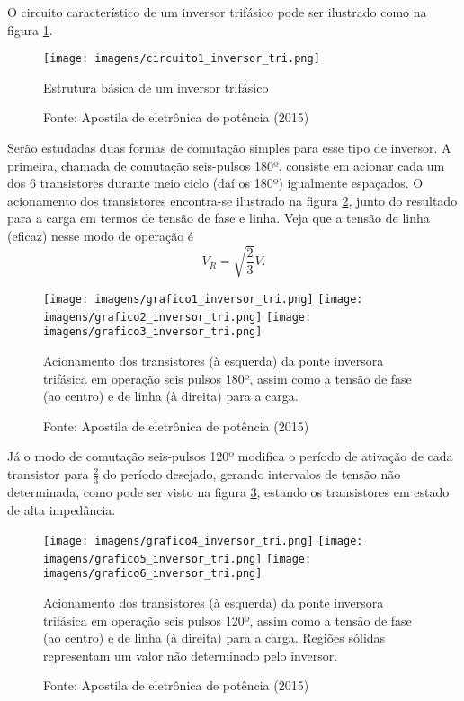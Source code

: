 
O circuito característico de um inversor trifásico pode ser ilustrado como na figura \ref{c1it}.

\begin{figure}[h]
\center
\texttt{[image: imagens/circuito1\_inversor\_tri.png]}
\caption{Estrutura básica de um inversor trifásico}\label{c1it} 
\caption*{Fonte: Apostila de eletrônica de potência (2015)}
\end{figure}

Serão estudadas duas formas de comutação simples para esse tipo de inversor. A primeira, chamada de comutação seis-pulsos 180º, consiste em acionar cada um dos 6 transistores durante meio ciclo (daí os 180º) igualmente espaçados. O acionamento dos transistores encontra-se ilustrado na figura \ref{g1it}, junto do resultado para a carga em termos de tensão de fase e linha. Veja que a tensão de linha (eficaz) nesse modo de operação é \[
V_R = \sqrt{\frac{2}{3}} V
.\] 

\begin{figure}[h]
\center
\texttt{[image: imagens/grafico1\_inversor\_tri.png]}
\texttt{[image: imagens/grafico2\_inversor\_tri.png]}
\texttt{[image: imagens/grafico3\_inversor\_tri.png]}
\caption{Acionamento dos transistores (à esquerda) da ponte inversora trifásica em operação seis pulsos 180º, assim como a tensão de fase (ao centro) e de linha (à direita) para a carga.}\label{g1it} 
\caption*{Fonte: Apostila de eletrônica de potência (2015)}
\end{figure}

Já o modo de comutação seis-pulsos 120º modifica o período de ativação de cada transistor para $\frac{2}{3}$ do período desejado, gerando intervalos de tensão não determinada, como pode ser visto na figura \ref{g4it}, estando os transistores em estado de alta impedância.
 
\begin{figure}[h]
\center
\texttt{[image: imagens/grafico4\_inversor\_tri.png]}
\texttt{[image: imagens/grafico5\_inversor\_tri.png]}
\texttt{[image: imagens/grafico6\_inversor\_tri.png]}
\caption{Acionamento dos transistores (à esquerda) da ponte inversora trifásica em operação seis pulsos 120º, assim como a tensão de fase (ao centro) e de linha (à direita) para a carga. Regiões sólidas representam um valor não determinado pelo inversor.}\label{g4it} 
\caption*{Fonte: Apostila de eletrônica de potência (2015)}
\end{figure}


